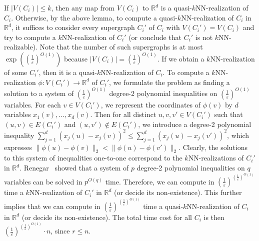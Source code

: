 \documentclass[11pt]{article}
\begin{document}
If $|V(C_i)| \leq k$, then any map from $V(C_i)$ to $\mathbb{R}^d$ is a quasi-$k$NN-realization of $C_i$.
Otherwise, by the above lemma, to compute a quasi-$k$NN-realization of $C_i$ in $\mathbb{R}^d$, it suffices to consider every supergraph $C_i'$ of $C_i$ with $V(C_i') = V(C_i)$ and try to compute a $k$NN-realization of $C_i'$ (or conclude that $C_i'$ is not $k$NN-realizable).
Note that the number of such supergraphs is at most $\exp({(\frac{1}{\varepsilon})^{O(1)}})$ because $|V(C_i)| = (\frac{1}{\varepsilon})^{O(1)}$.
If we obtain a $k$NN-realization of some $C_i'$, then it is a quasi-$k$NN-realization of $C_i$.
To compute a $k$NN-realization $\phi:V(C_i') \rightarrow \mathbb{R}^d$ of $C_i'$, we formulate the problem as finding a solution to a system of $(\frac{1}{\varepsilon})^{O(1)}$ degree-2 polynomial inequalities on $(\frac{1}{\varepsilon})^{O(1)}$ variables.
For each $v \in V(C_i')$, we represent the coordinates of $\phi(v)$ by $d$ variables $x_1(v),\dots,x_d(v)$.
Then for all distinct $u,v,v' \in V(C_i')$ such that $(u,v) \in E(C_i')$ and $(u,v') \notin E(C_i')$, we introduce a degree-2 polynomial inequality $\sum_{j=1}^d (x_j(u)-x_j(v))^2 \leq \sum_{j=1}^d (x_j(u)-x_j(v'))^2$, which expresses $\lVert \phi(u) - \phi(v) \rVert_2 < \lVert \phi(u) - \phi(v') \rVert_2$.
Clearly, the solutions to this system of inequalities one-to-one correspond to the $k$NN-realizations of $C_i'$ in $\mathbb{R}^d$.
Renegar~\cite{renegar:1992} showed that a system of $p$ degree-2 polynomial inequalities on $q$ variables can be solved in $p^{O(q)}$ time.
Therefore, we can compute in $(\frac{1}{\varepsilon})^{(\frac{1}{\varepsilon})^{O(1)}}$ time a $k$NN-realization of $C_i'$ in $\mathbb{R}^d$ (or decide its non-existence).
This further implies that we can compute in $(\frac{1}{\varepsilon})^{(\frac{1}{\varepsilon})^{O(1)}}$ time a quasi-$k$NN-realization of $C_i$ in $\mathbb{R}^d$ (or decide its non-existence).
The total time cost for all $C_i$ is then $(\frac{1}{\varepsilon})^{(\frac{1}{\varepsilon})^{O(1)}} \cdot n$, since $r \leq n$.
\end{document}
